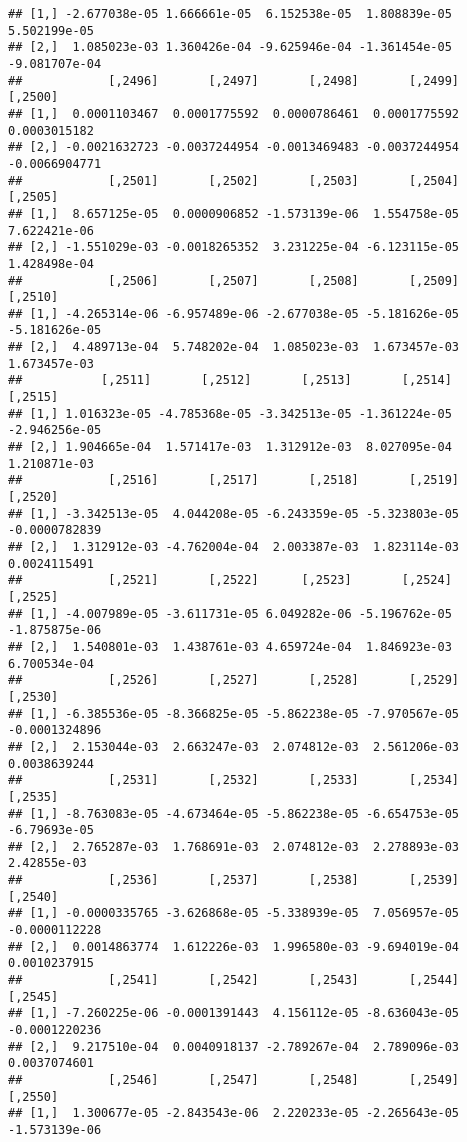 \documentclass[
]{article}
\begin{document}
\begin{verbatim}
## [1,] -2.677038e-05 1.666661e-05  6.152538e-05  1.808839e-05  5.502199e-05
## [2,]  1.085023e-03 1.360426e-04 -9.625946e-04 -1.361454e-05 -9.081707e-04
##            [,2496]       [,2497]       [,2498]       [,2499]       [,2500]
## [1,]  0.0001103467  0.0001775592  0.0000786461  0.0001775592  0.0003015182
## [2,] -0.0021632723 -0.0037244954 -0.0013469483 -0.0037244954 -0.0066904771
##            [,2501]       [,2502]       [,2503]       [,2504]      [,2505]
## [1,]  8.657125e-05  0.0000906852 -1.573139e-06  1.554758e-05 7.622421e-06
## [2,] -1.551029e-03 -0.0018265352  3.231225e-04 -6.123115e-05 1.428498e-04
##            [,2506]       [,2507]       [,2508]       [,2509]       [,2510]
## [1,] -4.265314e-06 -6.957489e-06 -2.677038e-05 -5.181626e-05 -5.181626e-05
## [2,]  4.489713e-04  5.748202e-04  1.085023e-03  1.673457e-03  1.673457e-03
##           [,2511]       [,2512]       [,2513]       [,2514]       [,2515]
## [1,] 1.016323e-05 -4.785368e-05 -3.342513e-05 -1.361224e-05 -2.946256e-05
## [2,] 1.904665e-04  1.571417e-03  1.312912e-03  8.027095e-04  1.210871e-03
##            [,2516]       [,2517]       [,2518]       [,2519]       [,2520]
## [1,] -3.342513e-05  4.044208e-05 -6.243359e-05 -5.323803e-05 -0.0000782839
## [2,]  1.312912e-03 -4.762004e-04  2.003387e-03  1.823114e-03  0.0024115491
##            [,2521]       [,2522]      [,2523]       [,2524]       [,2525]
## [1,] -4.007989e-05 -3.611731e-05 6.049282e-06 -5.196762e-05 -1.875875e-06
## [2,]  1.540801e-03  1.438761e-03 4.659724e-04  1.846923e-03  6.700534e-04
##            [,2526]       [,2527]       [,2528]       [,2529]       [,2530]
## [1,] -6.385536e-05 -8.366825e-05 -5.862238e-05 -7.970567e-05 -0.0001324896
## [2,]  2.153044e-03  2.663247e-03  2.074812e-03  2.561206e-03  0.0038639244
##            [,2531]       [,2532]       [,2533]       [,2534]      [,2535]
## [1,] -8.763083e-05 -4.673464e-05 -5.862238e-05 -6.654753e-05 -6.79693e-05
## [2,]  2.765287e-03  1.768691e-03  2.074812e-03  2.278893e-03  2.42855e-03
##            [,2536]       [,2537]       [,2538]       [,2539]       [,2540]
## [1,] -0.0000335765 -3.626868e-05 -5.338939e-05  7.056957e-05 -0.0000112228
## [2,]  0.0014863774  1.612226e-03  1.996580e-03 -9.694019e-04  0.0010237915
##            [,2541]       [,2542]       [,2543]       [,2544]       [,2545]
## [1,] -7.260225e-06 -0.0001391443  4.156112e-05 -8.636043e-05 -0.0001220236
## [2,]  9.217510e-04  0.0040918137 -2.789267e-04  2.789096e-03  0.0037074601
##            [,2546]       [,2547]       [,2548]       [,2549]       [,2550]
## [1,]  1.300677e-05 -2.843543e-06  2.220233e-05 -2.265643e-05 -1.573139e-06

\end{verbatim}
\end{document}
